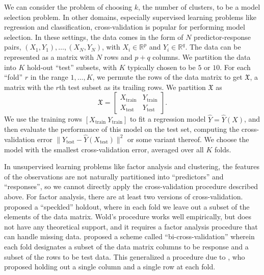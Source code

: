 \documentclass[12pt]{article}
\newcommand{\R}{\mathbb{R}}
\newcommand{\dataX}{\mathfrak{X}}
\newcommand{\Xtrain}{X_{\text{train}}}
\newcommand{\Ytrain}{Y_{\text{train}}}
\newcommand{\Xtest}{X_{\text{test}}}
\newcommand{\Ytest}{Y_{\text{test}}}
\begin{document}
We can consider the problem of choosing $k$, the number of clusters, to be a
model selection problem. In other domains, especially supervised learning
problems like regression and classification, cross-validation is popular for
performing model selection.
In these settings, the data comes in the form of $N$
predictor-response pairs, $(X_1, Y_1), \dotsc, (X_N, Y_N)$, with $X_i \in
\R^{p}$ and $Y_i \in \R^{q}$.  The data can be represented as a matrix with
$N$ rows and $p + q$ columns.  We partition the data into $K$ hold-out
``test'' subsets, with $K$ typically chosen to be $5$ or $10$.  For each
``fold'' $r$ in the range $1, \dotsc, K$, we permute the rows of the data
matrix to get $\dataX$, a matrix with the $r$th test subset as its trailing
rows.  We partition $\dataX$ as
\[
  \dataX =
  \begin{bmatrix}
    \Xtrain & \Ytrain \\
    \Xtest  & \Ytest
  \end{bmatrix}.
\]
We use the training rows $[ \Xtrain\ \Ytrain ]$ to fit a regression model
$\hat Y = \hat Y(X)$, and then evaluate the performance of this model on the
test set, computing the cross-validation error $\|\Ytest - \hat Y(\Xtest)\|^2$
or some variant thereof.  We choose the model with the smallest
cross-validation error, averaged over all $K$ folds.

In unsupervised learning problems like factor analysis and clustering, the
features of the observations are not naturally partitioned into ``predictors''
and ``responses'', so we cannot directly apply the cross-validation procedure
described above.  For factor analysis, there are at least two versions of
cross-validation.  \citet{wold78cross} proposed a ``speckled'' holdout, where
in each fold we leave out a subset of the elements of the data matrix.  Wold's
procedure works well empirically, but does not have any theoretical support,
and it requires a factor analysis procedure that can handle missing data.
\citet{owen2009bi} proposed a scheme called ``bi-cross-validation'' wherein
each fold designates a subset of the data matrix columns to be response and a
subset of the rows to be test data.  This generalized a procedure due to
\citet{gabriel2002biblot}, who proposed holding out a single column and a
single row at each fold.



\end{document}
